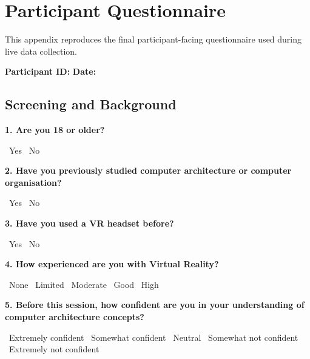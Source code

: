 \chapter{Participant Questionnaire}
\label{app:questionnaire}

This appendix reproduces the final participant-facing questionnaire used during live data collection.

\begingroup
\small
\setlength{\parindent}{0pt}
\setlength{\parskip}{0.5em}
\setlength{\tabcolsep}{4pt}

\newcommand{\formbox}{\fbox{\rule{0pt}{1.1ex}\rule{1.1ex}{0pt}}}
\newcommand{\formline}{\underline{\hspace{3cm}}}
\newcommand{\formanswerline}{\par\vspace{2.5em}\hrulefill\par}
\newcommand{\question}[1]{\par\medskip\textbf{#1}\par}
\newcommand{\responselegend}{\textit{Response options: SD = Strongly Disagree, D = Disagree, N = Neutral, A = Agree, SA = Strongly Agree.}}

\textbf{Participant ID:} \formline \hfill \textbf{Date:} \formline

\section*{Screening and Background}

\question{1. Are you 18 or older?}
\formbox\ Yes \hspace{2em} \formbox\ No

\question{2. Have you previously studied computer architecture or computer organisation?}
\formbox\ Yes \hspace{2em} \formbox\ No

\question{3. Have you used a VR headset before?}
\formbox\ Yes \hspace{2em} \formbox\ No

\question{4. How experienced are you with Virtual Reality?}
\formbox\ None \hspace{1em}
\formbox\ Limited \hspace{1em}
\formbox\ Moderate \hspace{1em}
\formbox\ Good \hspace{1em}
\formbox\ High

\question{5. Before this session, how confident are you in your understanding of computer architecture concepts?}
\formbox\ Extremely confident \hspace{0.6em}
\formbox\ Somewhat confident \hspace{0.6em}
\formbox\ Neutral \hspace{0.6em}
\formbox\ Somewhat not confident \hspace{0.6em}
\formbox\ Extremely not confident

